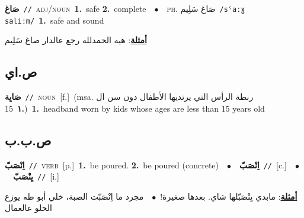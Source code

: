 \documentclass[10pt,a4paper,twoside]{article} %
\begin{document}
\begin{multicols}{2}
{\setlength\topsep{0pt}\textbf{\foreignlanguage{arabic}{صَاغ}}\ {\color{gray}\texttt{//}\color{black}}\ \textsc{adj/noun}\ \textbf{1.}~safe  \textbf{2.}~complete\ \ $\bullet$\ \ \textsc{ph.} \color{gray} \foreignlanguage{arabic}{صَاغ سَلِيم}\color{black}\ {\color{gray}\texttt{/{\sffamily sˤaːɣ saliːm}/}\color{black}}\ \textbf{1.}~safe and sound\  \begin{flushright}\color{gray}\foreignlanguage{arabic}{\textbf{\underline{\foreignlanguage{arabic}{أمثلة}}}: هيه الحمدلله رجع عالدار صاغ سَلِيم}\end{flushright}\color{black}} \vspace{2mm}

\vspace{-3mm}
\subsection*{\color{blue}\foreignlanguage{arabic}{ص.اي}\color{blue}{ (ntws)}} 

{\setlength\topsep{0pt}\textbf{\foreignlanguage{arabic}{صَايِة}}\ {\color{gray}\texttt{//}\color{black}}\ \textsc{noun}\ [f.]\ \color{gray}(msa. \foreignlanguage{arabic}{ربطة الرأس التي يرتديها الأطفال دون سن ال 15}~\foreignlanguage{arabic}{\textbf{١.}})\color{black}\ \textbf{1.}~headband worn by kids whose ages are less than 15 years old\ } \vspace{2mm}

\vspace{-3mm}
\subsection*{\color{blue}\foreignlanguage{arabic}{ص.ب.ب}\color{blue}{}} 

{\setlength\topsep{0pt}\textbf{\foreignlanguage{arabic}{اِنْصَبّ}}\ {\color{gray}\texttt{//}\color{black}}\ \textsc{verb}\ [p.]\ \textbf{1.}~be poured.  \textbf{2.}~be poured (concrete)\ \ $\bullet$\ \ \setlength\topsep{0pt}\textbf{\foreignlanguage{arabic}{اِنْصَبّ}}\ {\color{gray}\texttt{//}\color{black}}\ [c.]\ \ $\bullet$\ \ \setlength\topsep{0pt}\textbf{\foreignlanguage{arabic}{يِنْصَبّ}}\ {\color{gray}\texttt{//}\color{black}}\ [i.]\  \begin{flushright}\color{gray}\foreignlanguage{arabic}{\textbf{\underline{\foreignlanguage{arabic}{أمثلة}}}: مابدي يِنْصَبّلها شاي. بعدها صغيرة!\ $\bullet$\ \  مجرد ما اِنْصَبّت الصبة، خلي أبو طه يوزع الحلو عالعمال}\end{flushright}\color{black}} \vspace{2mm}


\end{multicols}
\end{document}
